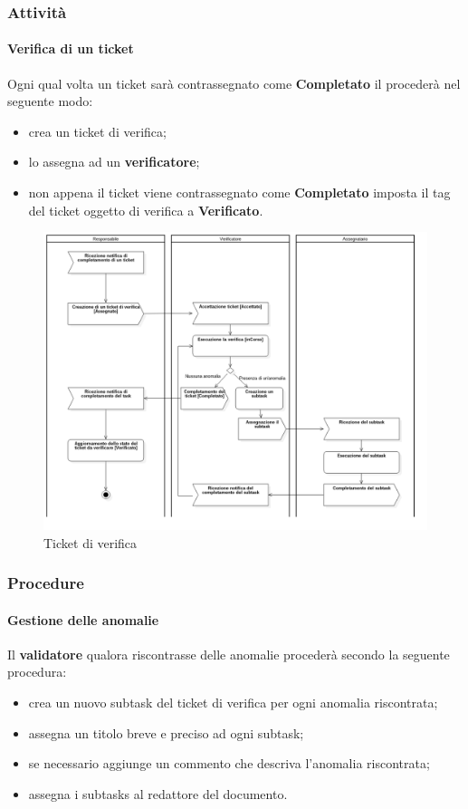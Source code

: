 \subsubsection{Attività}
	\paragraph{Verifica di un ticket}
	Ogni qual volta un ticket sarà contrassegnato come \textbf{Completato} il \RES procederà nel seguente modo: 
	\begin{itemize}
		\item crea un ticket di verifica;
		\item lo assegna ad un \textbf{verificatore};
		\item non appena il ticket viene contrassegnato come \textbf{Completato} imposta il tag del ticket oggetto di verifica a \textbf{Verificato}.
	\end{itemize}
	\begin{figure}
		\centering
		\includegraphics[scale=0.40]{img/ticketVerifica.png}
		\caption{Ticket di verifica}
	\end{figure}
\subsubsection{Procedure}
	\paragraph{Gestione delle anomalie}
			Il \textbf{validatore} qualora riscontrasse delle anomalie procederà secondo la seguente procedura:
			\begin{itemize}
				\item crea un nuovo subtask del ticket di verifica per ogni anomalia riscontrata;
				\item assegna un titolo breve e preciso ad ogni subtask;
				\item se necessario aggiunge un commento che descriva l'anomalia riscontrata;
				\item assegna i subtasks al redattore del documento.
			\end{itemize}